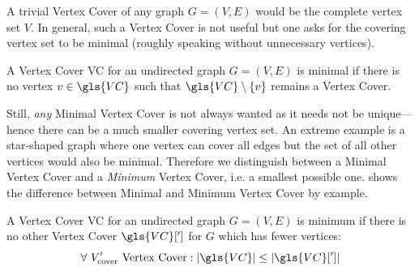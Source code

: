 A trivial Vertex Cover of any graph \(G=(V,E)\) would be the complete
vertex set \(V\). In general, such a Vertex Cover is not useful but
one asks for the covering vertex set to be minimal (roughly speaking
without unnecessary vertices).

\begin{definition}
  A Vertex Cover \gls{VC} for an undirected graph
  \(G=(V,E)\) is minimal if there is no vertex
  \(v \in \gls{VC}\) such that
  \(\gls{VC} \setminus \{v\}\) remains a Vertex Cover.
\end{definition}

Still, \emph{any} Minimal Vertex Cover is not always wanted as it
needs not be unique---hence there can be a much smaller covering
vertex set. An extreme example is a star-shaped graph where one vertex
can cover all edges but the set of all other vertices would also be
minimal. Therefore we distinguish between a Minimal Vertex Cover and
a \emph{Minimum} Vertex Cover, i.e. a smallest possible one. 
 shows the difference between Minimal
and Minimum Vertex Cover by example.

\begin{definition}
  A Vertex Cover \gls{VC} for an undirected graph
  \(G=(V,E)\) is minimum if there is no other Vertex Cover
  \(\gls{VC}[']\) for \(G\) which has fewer vertices:
  \[
    \forall~V_{\text{cover}}'\text{ Vertex Cover} :
    |\gls{VC}| \leq |\gls{VC}[']|
  \]
\end{definition}


